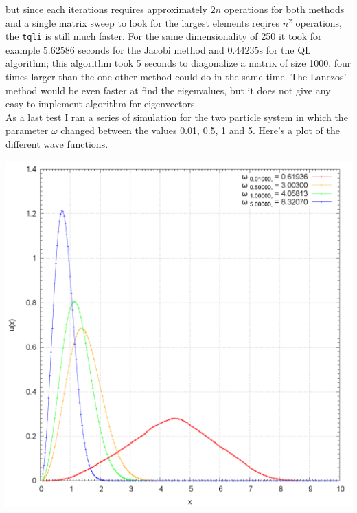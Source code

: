 \documentclass[10pt,a4paper,titlepage]{article}
\begin{document}
but since each iterations requires approximately $2n$ operations for both methods and a single matrix sweep to look for the largest elements reqires $n^2$
operations, the  \texttt{tqli} is still much faster. For the same dimensionality of 250 it took for example $5.62586$ seconds for the Jacobi method
and $0.44235$s for the QL algorithm; this algorithm took 5 seconds to diagonalize a matrix of size 1000, four times larger than the one other method could 
do in the same time. The Lanczos' method would be even faster at find the eigenvalues, but it does not give any easy to implement algorithm for 
eigenvectors.\\
As a last test I ran a series of simulation for the two particle system in which the parameter $\omega$ changed between the values 0.01, 0.5, 1 and 5.
Here's a plot of the different wave functions.  \\
\begin{minipage}{0.5\textwidth}
	\includegraphics[width=0.8\columnwidth]{plot_omega_u.png}
\end{minipage}
\end{document}
